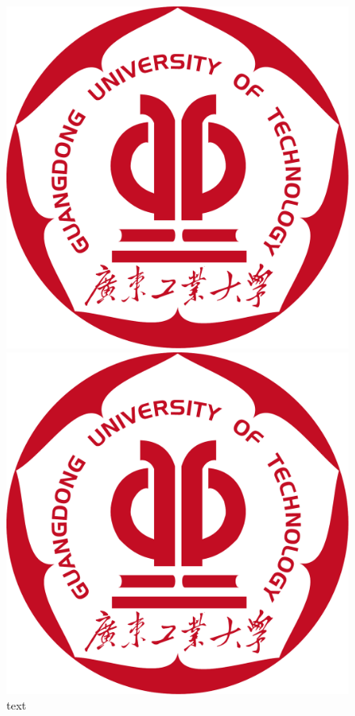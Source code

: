 \begin{figure}[h]
    \centering
    \begin{minipage}{0.4\textwidth}
        \centering
        \includegraphics[width=\linewidth]{figures/logo.pdf}
        \caption{text}
    \end{minipage}
    \hfill
    \begin{minipage}{0.4\textwidth}
        \centering
        \includegraphics[width=\linewidth]{figures/logo.pdf}

\end{minipage}
\end{figure}
